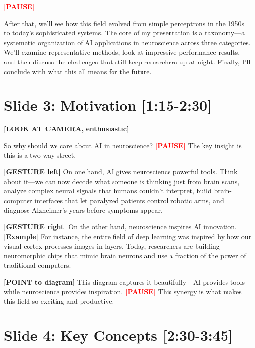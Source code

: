 \documentclass[12pt]{article}
\begin{document}
\textcolor{red}{\textbf{[PAUSE]}}

After that, we'll see how this field evolved from simple perceptrons in the 1950s to today's sophisticated systems. The core of my presentation is a \ul{taxonomy}—a systematic organization of AI applications in neuroscience across three categories. We'll examine representative methods, look at impressive performance results, and then discuss the challenges that still keep researchers up at night. Finally, I'll conclude with what this all means for the future.

\hrulefill

\section*{Slide 3: Motivation [1:15-2:30]}

\textcolor{DukeBlue}{\textbf{[LOOK AT CAMERA, enthusiastic]}}

So why should we care about AI in neuroscience? \textcolor{red}{\textbf{[PAUSE]}} The key insight is this is a \ul{two-way street}.

\textcolor{DukeBlue}{\textbf{[GESTURE left]}} On one hand, AI gives neuroscience powerful tools. Think about it—we can now decode what someone is thinking just from brain scans, analyze complex neural signals that humans couldn't interpret, build brain-computer interfaces that let paralyzed patients control robotic arms, and diagnose Alzheimer's years before symptoms appear.

\textcolor{DukeBlue}{\textbf{[GESTURE right]}} On the other hand, neuroscience inspires AI innovation. \textcolor{green!60!black}{\textbf{[Example]}} For instance, the entire field of deep learning was inspired by how our visual cortex processes images in layers. Today, researchers are building neuromorphic chips that mimic brain neurons and use a fraction of the power of traditional computers.

\textcolor{DukeBlue}{\textbf{[POINT to diagram]}} This diagram captures it beautifully—AI provides tools while neuroscience provides inspiration. \textcolor{red}{\textbf{[PAUSE]}} This \ul{synergy} is what makes this field so exciting and productive.

\hrulefill

\section*{Slide 4: Key Concepts [2:30-3:45]}
\end{document}
